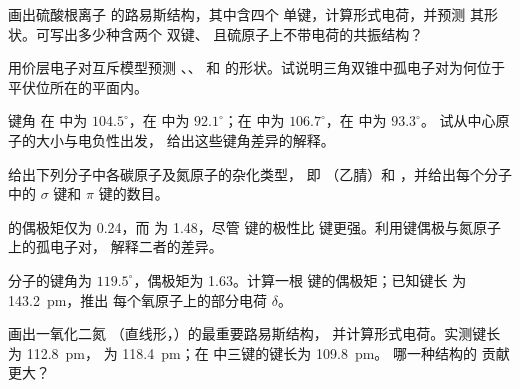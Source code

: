 \begin{exercise}[$\star\star$]\label{exo:b1:lewis-resonance-vsepr:6}
画出硫酸根离子  的路易斯结构，其中含四个
 单键，计算形式电荷，并预测
其形状。可写出多少种含两个  双键、
且硫原子上不带电荷的共振结构？
\end{exercise}

\begin{exercise}[$\star\star$]\label{exo:b1:lewis-resonance-vsepr:7}
用价层电子对互斥模型预测 、、 和
 的形状。试说明三角双锥中孤电子对为何位于
平伏位所在的平面内。
\end{exercise}

\begin{exercise}[$\star\star$]\label{exo:b1:lewis-resonance-vsepr:8}
键角  在  中为 $104.5^\circ$，在
 中为 $92.1^\circ$；在  中为 $106.7^\circ$，在  中为 $93.3^\circ$。
试从中心原子的大小与电负性出发，
给出这些键角差异的解释。
\end{exercise}

\begin{exercise}[$\star\star$]\label{exo:b1:lewis-resonance-vsepr:9}
给出下列分子中各碳原子及氮原子的杂化类型，
即 （乙腈）和 ，并给出每个分子中的
$\sigma$ 键和 $\pi$ 键的数目。
\end{exercise}

\begin{exercise}[$\star\star\star$]\label{exo:b1:lewis-resonance-vsepr:10}
 的偶极矩仅为 \qty{0.24}{\debye}，而
 为 \qty{1.48}{\debye}，尽管  键的极性比
 键更强。利用键偶极与氮原子上的孤电子对，
解释二者的差异。
\end{exercise}

\begin{exercise}[$\star\star\star$]\label{exo:b1:lewis-resonance-vsepr:11}
 分子的键角为 $119.5^\circ$，偶极矩为
\qty{1.63}{\debye}。计算一根  键的偶极矩；已知键长
为 \qty{143.2}{pm}，推出
每个氧原子上的部分电荷 $\delta$。
\end{exercise}

\begin{exercise}[$\star\star\star$]\label{exo:b1:lewis-resonance-vsepr:12}
画出一氧化二氮 （直线形，）的最重要路易斯结构，
并计算形式电荷。实测键长  为 \qty{112.8}{pm}， 为
\qty{118.4}{pm}；在  中三键的键长为 \qty{109.8}{pm}。
哪一种结构的
贡献更大？
\end{exercise}

